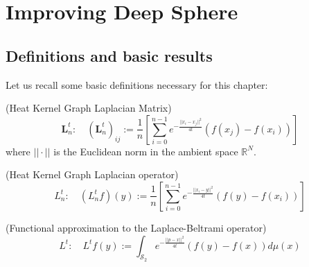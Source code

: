 

\section{Improving Deep Sphere}

\subsection{Definitions and basic results}

Let us recall some basic definitions necessary for this chapter:
\vspace{0.5cm}
\begin{definition}{}(Heat Kernel Graph Laplacian Matrix)\\
	\label{def:Heat Kernel Graph Laplacian Matrix}
	$$\mathbf L_n^t:\quad(\mathbf L_n^t)_{ij} := \frac{1}{n}\left[ \sum_{i=0}^{n-1} e^{-\frac{||x_i-x_j||^2}{4t}}\left(f(x_j)-f(x_i)\right)\right]$$
	where $||\cdot||$ is the Euclidean norm in the ambient space $\mathbb R^N$.
\end{definition}
\vspace{0.5cm}
\begin{definition}{}(Heat Kernel Graph Laplacian operator)\\
	\label{def:Heat Kernel Graph Laplacian operator}
	$$L_n^t:\quad(L_n^tf)(y) := \frac{1}{n}\left[ \sum_{i=0}^{n-1} e^{-\frac{||x_i-y||^2}{4t}}\left(f(y)-f(x_i)\right)\right]$$
\end{definition}
\vspace{0.5cm}
\begin{definition}{}(Functional approximation to the Laplace-Beltrami operator)\\ \label{eq: my L^t}
	\label{def:Functional approximation to the Laplace-Beltrami operator}
	$$L^t:\quad L^tf(y) := \int_{\mathcal S_2}e^{-\frac{||p-x||^2}{4t}}\left(f(y)-f(x)\right)d\mu(x)$$
\end{definition}
\vspace{0.5cm}

